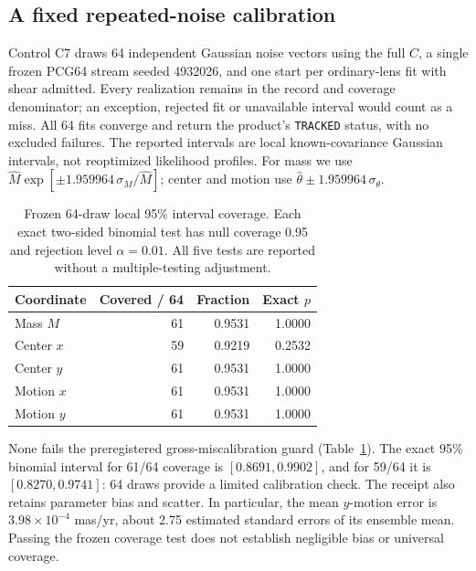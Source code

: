 \subsection{A fixed repeated-noise calibration}
Control C7 draws 64 independent Gaussian noise vectors using the full
$C$, a single frozen PCG64 stream seeded 4932026, and one start per
ordinary-lens fit with shear admitted. Every realization remains in the
record and coverage denominator; an exception, rejected fit or unavailable
interval would count as a miss. All 64 fits converge and return the
product's \texttt{TRACKED} status, with no excluded failures.
The reported intervals are local known-covariance Gaussian intervals,
not reoptimized likelihood profiles. For mass we use
$\widehat M\exp[\pm1.959964\,\sigma_M/\widehat M]$; center and motion
use $\widehat\theta\pm1.959964\,\sigma_\theta$.

\begin{table}[tbp]
\centering\small
\caption{Frozen 64-draw local 95\% interval coverage. Each exact two-sided
binomial test has null coverage 0.95 and rejection level $\alpha=0.01$.
All five tests are reported without a multiple-testing adjustment.}
\label{tab:product-coverage}
\begin{tabular}{@{}lrrr@{}}
\toprule
Coordinate & Covered / 64 & Fraction & Exact $p$\\
\midrule
Mass $M$ & 61 & 0.9531 & 1.0000\\
Center $x$ & 59 & 0.9219 & 0.2532\\
Center $y$ & 61 & 0.9531 & 1.0000\\
Motion $x$ & 61 & 0.9531 & 1.0000\\
Motion $y$ & 61 & 0.9531 & 1.0000\\
\bottomrule
\end{tabular}
\end{table}

None fails the preregistered gross-miscalibration guard
(Table~\ref{tab:product-coverage}). The exact 95\% binomial interval for
61/64 coverage is $[0.8691,0.9902]$, and for 59/64 it is
$[0.8270,0.9741]$: 64 draws provide a limited calibration check.
The receipt also retains parameter bias and scatter. In particular, the
mean $y$-motion error is $3.98\times10^{-4}$ mas/yr, about 2.75 estimated
standard errors of its ensemble mean. Passing the frozen coverage test
does not establish negligible bias or universal coverage.

